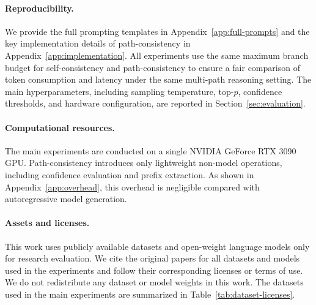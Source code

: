 \paragraph{Reproducibility.}
We provide the full prompting templates in Appendix~\ref{app:full-prompts} and the key implementation details of path-consistency in Appendix~\ref{app:implementation}. All experiments use the same maximum branch budget for self-consistency and path-consistency to ensure a fair comparison of token consumption and latency under the same multi-path reasoning setting. The main hyperparameters, including sampling temperature, top-$p$, confidence thresholds, and hardware configuration, are reported in Section~\ref{sec:evaluation}. 

\paragraph{Computational resources.}
The main experiments are conducted on a single NVIDIA GeForce RTX 3090 GPU. Path-consistency introduces only lightweight non-model operations, including confidence evaluation and prefix extraction. As shown in Appendix~\ref{app:overhead}, this overhead is negligible compared with autoregressive model generation.

\paragraph{Assets and licenses.}

This work uses publicly available datasets and open-weight language models only for research evaluation. We cite the original papers for all datasets and models used in the experiments and follow their corresponding licenses or terms of use. We do not redistribute any dataset or model weights in this work. The datasets used in the main experiments are summarized in Table~\ref{tab:dataset-licenses}.

